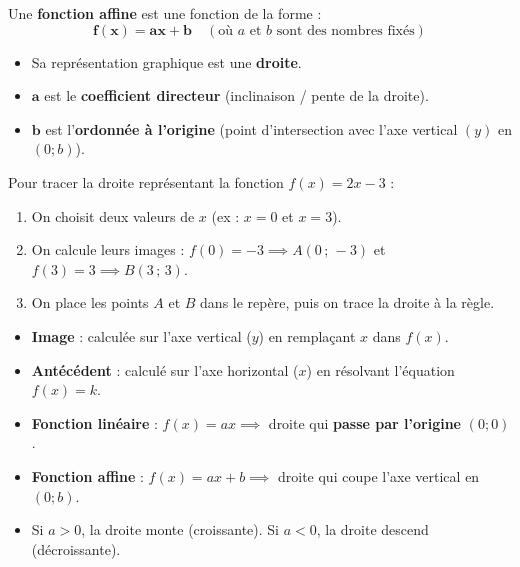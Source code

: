 \begin{cadredef}
Une \textbf{fonction affine} est une fonction de la forme :
\[ \mathbf{f(x) = ax + b} \quad (\text{où } a \text{ et } b \text{ sont des nombres fixés}) \]
\begin{itemize}[leftmargin=1.5em, itemsep=2pt]
    \item Sa représentation graphique est une \textbf{droite}.
    \item $\mathbf{a}$ est le \textbf{coefficient directeur} (inclinaison / pente de la droite).
    \item $\mathbf{b}$ est l'\textbf{ordonnée à l'origine} (point d'intersection avec l'axe vertical $(y)$ en $(0;b)$).
\end{itemize}
\end{cadredef}

\begin{cadremethode}
Pour tracer la droite représentant la fonction $f(x) = 2x - 3$ :
\begin{enumerate}[leftmargin=1.5em, itemsep=2pt]
    \item On choisit deux valeurs de $x$ (ex : $x = 0$ et $x = 3$).
    \item On calcule leurs images : $f(0) = -3 \implies A(0\,;\,-3)$ et $f(3) = 3 \implies B(3\,;\,3)$.
    \item On place les points $A$ et $B$ dans le repère, puis on trace la droite à la règle.
\end{enumerate}
\end{cadremethode}

\begin{cadreretenu}
\begin{itemize}[leftmargin=1.5em, itemsep=2pt]
    \item \textbf{Image} : calculée sur l'axe vertical ($y$) en remplaçant $x$ dans $f(x)$.
    \item \textbf{Antécédent} : calculé sur l'axe horizontal ($x$) en résolvant l'équation $f(x) = k$.
    \item \textbf{Fonction linéaire} : $f(x) = ax \implies$ droite qui \textbf{passe par l'origine} $(0;0)$.
    \item \textbf{Fonction affine} : $f(x) = ax + b \implies$ droite qui coupe l'axe vertical en $(0;b)$.
    \item Si $a > 0$, la droite monte (croissante). Si $a < 0$, la droite descend (décroissante).
\end{itemize}
\end{cadreretenu}

